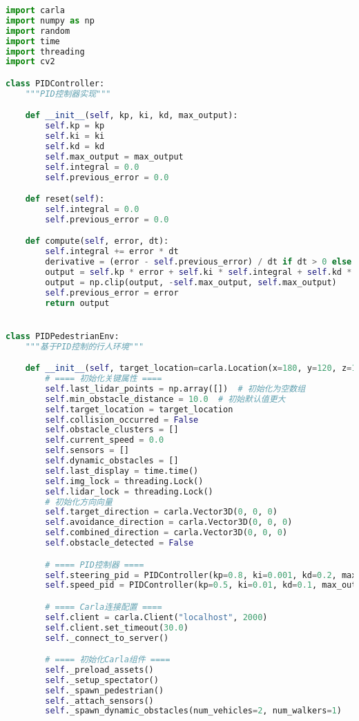 \begin{lstlisting}[language=Python]
import carla
import numpy as np
import random
import time
import threading
import cv2

class PIDController:
    """PID控制器实现"""

    def __init__(self, kp, ki, kd, max_output):
        self.kp = kp
        self.ki = ki
        self.kd = kd
        self.max_output = max_output
        self.integral = 0.0
        self.previous_error = 0.0

    def reset(self):
        self.integral = 0.0
        self.previous_error = 0.0

    def compute(self, error, dt):
        self.integral += error * dt
        derivative = (error - self.previous_error) / dt if dt > 0 else 0.0
        output = self.kp * error + self.ki * self.integral + self.kd * derivative
        output = np.clip(output, -self.max_output, self.max_output)
        self.previous_error = error
        return output


class PIDPedestrianEnv:
    """基于PID控制的行人环境"""

    def __init__(self, target_location=carla.Location(x=180, y=120, z=1)):
        # ==== 初始化关键属性 ====
        self.last_lidar_points = np.array([])  # 初始化为空数组
        self.min_obstacle_distance = 10.0  # 初始默认值更大
        self.target_location = target_location
        self.collision_occurred = False
        self.obstacle_clusters = []
        self.current_speed = 0.0
        self.sensors = []
        self.dynamic_obstacles = []
        self.last_display = time.time()
        self.img_lock = threading.Lock()
        self.lidar_lock = threading.Lock()
        # 初始化方向向量
        self.target_direction = carla.Vector3D(0, 0, 0)
        self.avoidance_direction = carla.Vector3D(0, 0, 0)
        self.combined_direction = carla.Vector3D(0, 0, 0)
        self.obstacle_detected = False

        # ==== PID控制器 ====
        self.steering_pid = PIDController(kp=0.8, ki=0.001, kd=0.2, max_output=30)
        self.speed_pid = PIDController(kp=0.5, ki=0.01, kd=0.1, max_output=3.0)

        # ==== Carla连接配置 ====
        self.client = carla.Client("localhost", 2000)
        self.client.set_timeout(30.0)
        self._connect_to_server()

        # ==== 初始化Carla组件 ====
        self._preload_assets()
        self._setup_spectator()
        self._spawn_pedestrian()
        self._attach_sensors()
        self._spawn_dynamic_obstacles(num_vehicles=2, num_walkers=1)


\end{lstlisting}
